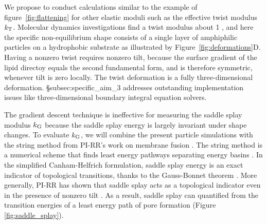 We propose to conduct calculations similar to the example of figure~\ref{fig:flattening} for other elastic moduli such as the effective twist modulus $k_{\mathrm{T}}$.
Molecular dynamics investigations find a twist modulus about 1 \kBT \cite{LeVeWa14}, and here the specific non-equilibrium shape consists of a single layer of amphiphilic particles on a hydrophobic substrate as illustrated by Figure~\ref{fig:deformations}D. Having a nonzero twist requires nonzero tilt, because the surface gradient of the lipid directoy equals the second fundamental form, and is therefore symmetric, whenever tilt is zero locally. The twist deformation is a fully three-dimensional deformation. \S subsec:specific_aim_3 addresses outstanding implementation issues like three-dimensional boundary integral equation solvers.

%
The gradient descent technique is ineffective for measuring the saddle splay modulus $k_{\mathrm{G}}$ because
the saddle splay energy is largely invariant under shape changes.
To evaluate $k_{\mathrm{G}}$, we will combine the present particle simulations with the string method 
from PI-RR's work on membrane fusion \cite{RyKlYaCo16}. The string method is a numerical scheme that finds
least energy pathways separating energy basins \cite{doi:10.1063/1.2720838}. 
In the simplified Canham-Helfrich formulation, saddle splay energy is an exact indicator of topological transitions, 
thanks to the  Gauss-Bonnet theorem \cite{TerziDeserno17}.
More generally, PI-RR has shown that saddle splay acts as a topological indicator even in the presence of nonzero tilt \cite{RyKlYaCo16}. 
As a result, saddle splay can quantified from the transition energies of a least energy path of pore formation (Figure \ref{fig:saddle_splay}).   
%
%

